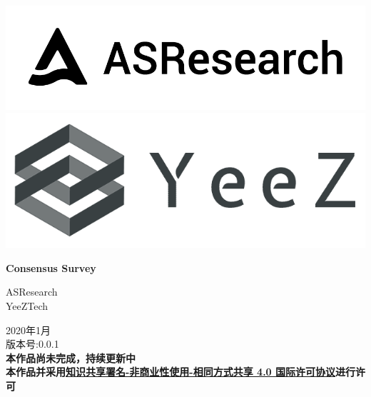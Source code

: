 \documentclass[12pt]{article}
\begin{document}
\pagestyle{empty}
\renewcommand{\contentsname}{目录}
\renewcommand{\abstractname}{摘要}
\renewcommand{\refname}{参考文献}
\renewcommand{\figurename}{图}
\renewcommand{\tablename}{表}
\renewcommand{\baselinestretch}{1.5}
\renewcommand{\appendixname}{附录}
\renewcommand{\proofname}{证明}

\pagecolor{\pcolor}

\begin{titlepage}
  \begin{center}
    \vspace*{2.5cm}
    \includegraphics[scale=0.2]{../common/logo.png}\\
    \includegraphics[scale=0.2]{../common/yeez.png}

    \vspace{3.5cm}


  \textbf{\huge{Consensus Survey}}

    \vspace{2.5cm}
    ASResearch\\
    YeeZTech

    \vfill
    2020年1月 \\
    版本号:0.0.1\\
    \textbf{本作品尚未完成，持续更新中\\本作品并采用\href{http://creativecommons.org/licenses/by-nc-sa/4.0/}{知识共享署名-非商业性使用-相同方式共享 4.0 国际许可协议}进行许可}
  \end{center}

\end{titlepage}
\setcounter{page}{0}
\tableofcontents
\newpage
\setcounter{page}{1}
\pagestyle{fancy}
\vspace*{0.01cm}


\end{document}
